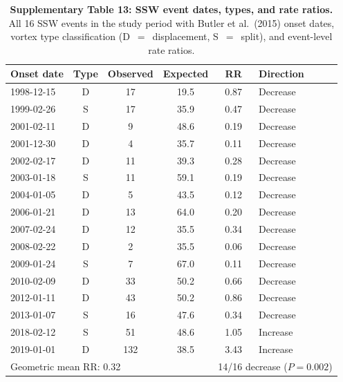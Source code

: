 \documentclass[11pt,letterpaper]{article}
\begin{document}
\begin{table}[!ht]
\centering
\caption{\textbf{Supplementary Table 13: SSW event dates, types, and rate ratios.}
All 16 SSW events in the study period with Butler et al.\ (2015) onset dates, vortex type classification (D~$=$~displacement, S~$=$~split), and event-level rate ratios.}
\label{tab:ssw_dates}
\small
\begin{tabular}{lccccl}
\toprule
Onset date & Type & Observed & Expected & RR & Direction \\
\midrule
1998-12-15 & D & 17 & 19.5 & 0.87 & Decrease \\
1999-02-26 & S & 17 & 35.9 & 0.47 & Decrease \\
2001-02-11 & D & 9 & 48.6 & 0.19 & Decrease \\
2001-12-30 & D & 4 & 35.7 & 0.11 & Decrease \\
2002-02-17 & D & 11 & 39.3 & 0.28 & Decrease \\
2003-01-18 & S & 11 & 59.1 & 0.19 & Decrease \\
2004-01-05 & D & 5 & 43.5 & 0.12 & Decrease \\
2006-01-21 & D & 13 & 64.0 & 0.20 & Decrease \\
2007-02-24 & D & 12 & 35.5 & 0.34 & Decrease \\
2008-02-22 & D & 2 & 35.5 & 0.06 & Decrease \\
2009-01-24 & S & 7 & 67.0 & 0.11 & Decrease \\
2010-02-09 & D & 33 & 50.2 & 0.66 & Decrease \\
2012-01-11 & D & 43 & 50.2 & 0.86 & Decrease \\
2013-01-07 & S & 16 & 47.6 & 0.34 & Decrease \\
2018-02-12 & S & 51 & 48.6 & 1.05 & Increase \\
2019-01-01 & D & 132 & 38.5 & 3.43 & Increase \\
\midrule
\multicolumn{4}{l}{Geometric mean RR: 0.32} & \multicolumn{2}{l}{14/16 decrease ($P = 0.002$)} \\
\bottomrule
\end{tabular}
\end{table}
\end{document}
